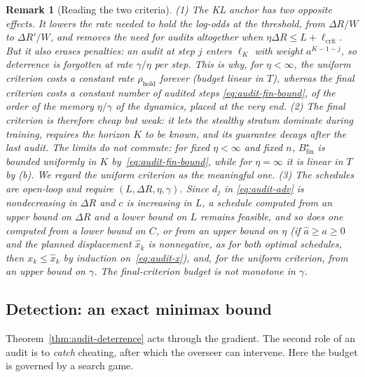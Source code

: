 \documentclass[11pt,a4paper]{article}
\newtheorem{remark}[theorem]{Remark}
\begin{document}
\begin{remark}[Reading the two criteria]\label{rem:audit-criteria}
(1) The KL anchor has two opposite effects. It lowers the rate needed to hold
the log-odds at the threshold, from $\Delta R/W$ to $\Delta R'/W$, and removes
the need for audits altogether when $\eta\Delta R\le L+\ell_{\mathrm{crit}}$.
But it also erases penalties: an audit at step $j$ enters $\ell_K$ with weight
$a^{K-1-j}$, so deterrence is forgotten at rate $\gamma/\eta$ per step. This is
why, for $\eta<\infty$, the uniform criterion costs a constant \emph{rate}
$\rho_{\mathrm{hold}}$ forever (budget linear in $T$), whereas the final
criterion costs a constant \emph{number} of audited steps
\eqref{eq:audit-fin-bound}, of the order of the memory $\eta/\gamma$ of the
dynamics, placed at the very end. (2) The final criterion is therefore cheap
but weak: it lets the stealthy stratum dominate during training, requires the
horizon $K$ to be known, and its guarantee decays after the last audit. The
limits do not commute: for fixed $\eta<\infty$ and fixed $n$, $B^\star_{\mathrm{fin}}$ is bounded uniformly in $K$ by~\eqref{eq:audit-fin-bound}, while for $\eta=\infty$ it is linear in $T$ by (b). We regard the
uniform criterion as the meaningful one. (3) The schedules are open-loop and
require $(L,\Delta R,\eta,\gamma)$. Since $d_j$ in \eqref{eq:audit-adv} is
nondecreasing in $\Delta R$ and $c$ is increasing in $L$, a schedule computed
from an upper bound on $\Delta R$ and a lower bound on $L$ remains feasible, and so does one computed from a lower bound on $C$, or from an upper bound on $\eta$ (if $\hat a\ge a\ge0$ and the planned displacement $\hat x_k$ is nonnegative, as for both optimal schedules, then $x_k\le\hat x_k$ by induction on~\eqref{eq:audit-x}), and, for the uniform criterion, from an upper bound on $\gamma$. The final-criterion budget is not monotone in $\gamma$.
\end{remark}

\subsection{Detection: an exact minimax bound}

Theorem~\ref{thm:audit-deterrence} acts through the gradient. The second role
of an audit is to \emph{catch} cheating, after which the overseer can
intervene. Here the budget is governed by a search game.
\end{document}
